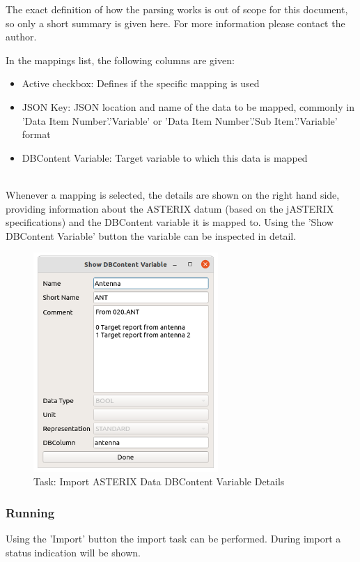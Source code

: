 The exact definition of how the parsing works is out of scope for this document, so only a short summary is given here. For more information please contact the author.

In the mappings list, the following columns are given:

\begin{itemize}
\item Active checkbox: Defines if the specific mapping is used
\item JSON Key: JSON location and name of the data to be mapped, commonly in 'Data Item Number'.'Variable' or 'Data Item Number'.'Sub Item'.'Variable' format
\item DBContent Variable: Target variable to which this data is mapped
\end{itemize}
\ \\

Whenever a mapping is selected, the details are shown on the right hand side, providing information about the ASTERIX datum (based on the jASTERIX specifications) and the DBContent variable it is mapped to. 
Using the 'Show DBContent Variable' button the variable can be inspected in detail.

\begin{figure}[H]
  \center
    \includegraphics[width=7cm]{figures/asterix_import_data_dbcont_var_details.png}
  \caption{Task: Import ASTERIX Data DBContent Variable Details}
\end{figure}

\subsubsection{Running}

Using the 'Import' button the import task can be performed. During import a status indication will be shown. \\

